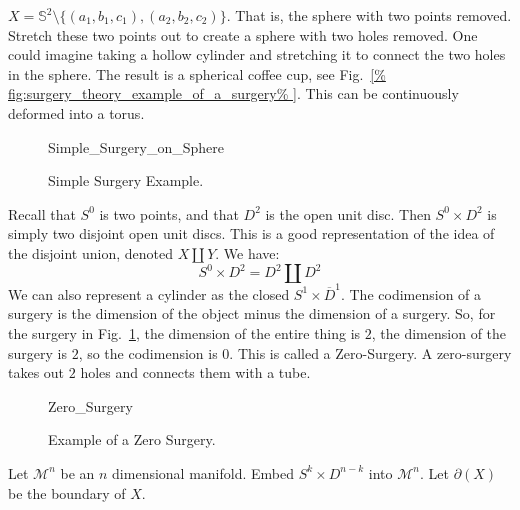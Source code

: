 \documentclass[crop=false,class=article,oneside]{standalone}
\begin{document}
            $X=\mathbb{S}^{2}\setminus%
             \{(a_{1},b_{1},c_{1}),(a_{2},b_{2},c_{2})\}$.
            That is, the sphere with two points removed.
            Stretch these two points out to create a sphere
            with two holes removed. One could imagine taking
            a hollow cylinder and stretching it to connect
            the two holes in the sphere. The result is a
            spherical coffee cup, see
            Fig.~\ref{%
                fig:surgery_theory_example_of_a_surgery%
            }.
            This can be continuously deformed into a torus.
            \begin{figure}[H]
                \centering
                \captionsetup{type=figure}
                
                          {Simple_Surgery_on_Sphere}
                \caption{Simple Surgery Example.}
                \label{fig:surgery_theory_example_of_a_surgery}
            \end{figure}
            Recall that $S^{0}$ is two points, and that
            $D^{2}$ is the open unit disc. Then $S^{0}\times D^{2}$
            is simply two disjoint open unit discs. This is a good
            representation of the idea of the disjoint union,
            denoted $X\coprod Y$. We have:
            \begin{equation*}
                S^{0}\times{D^{2}}=D^{2}\coprod{D^{2}}
            \end{equation*}
            We can also represent a cylinder as the closed
            $S^{1}\times \overline{D}^{1}$. The codimension
            of a surgery is the dimension of the object minus
            the dimension of a surgery. So, for the surgery
            in Fig.~\ref{fig:surgery_theory_example_of_a_surgery},
            the dimension of the entire thing is $2$, the dimension
            of the surgery is $2$, so the codimension is $0$.
            This is called a Zero-Surgery. A zero-surgery takes
            out $2$ holes and connects them with a tube.
            \begin{figure}[H]
                \centering
                \captionsetup{type=figure}
                {Zero_Surgery}
                \caption{Example of a Zero Surgery.}
                \label{fig:surgery_theory_a_zero_surgery}
            \end{figure}
            Let $\mathcal{M}^{n}$ be an $n$ dimensional manifold.
            Embed
            $S^{k}\times D^{n-k}$ into $\mathcal{M}^{n}$.
            Let $\partial(X)$ be the boundary of $X$.
\end{document}
